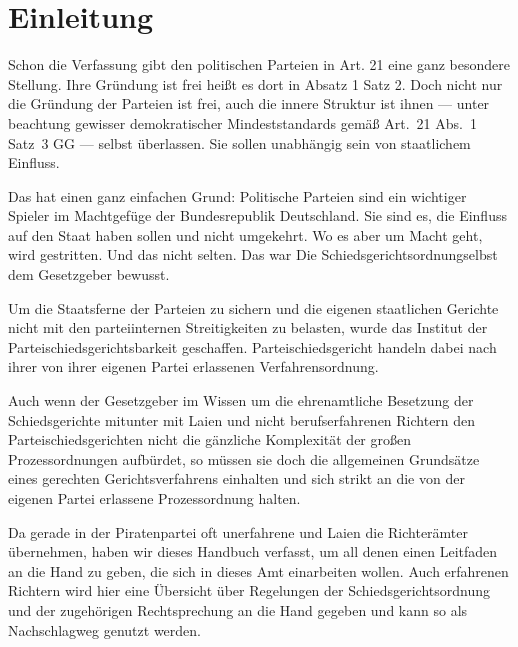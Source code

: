 
\chapter{Einleitung}
Schon die Verfassung gibt den politischen Parteien in Art. 21 eine ganz besondere Stellung.
Ihre Gründung ist frei heißt es dort in Absatz 1 Satz 2.
Doch nicht nur die Gründung der Parteien ist frei, auch die innere Struktur ist ihnen --- unter beachtung gewisser demokratischer Mindeststandards gemäß Art.~21 Abs.~1 Satz~3 GG --- selbst überlassen.
Sie sollen unabhängig sein von staatlichem Einfluss.

Das hat einen ganz einfachen Grund: Politische Parteien sind ein wichtiger Spieler im Machtgefüge der Bundesrepublik Deutschland.
Sie sind es, die Einfluss auf den Staat haben sollen und nicht umgekehrt.
Wo es aber um Macht geht, wird gestritten.
Und das nicht selten.
Das war Die Schiedsgerichtsordnungselbst dem Gesetzgeber bewusst.

Um die Staatsferne der Parteien zu sichern und die eigenen staatlichen Gerichte nicht mit den parteiinternen Streitigkeiten zu belasten, wurde das Institut der Parteischiedsgerichtsbarkeit geschaffen.
Parteischiedsgericht handeln dabei nach ihrer von ihrer eigenen Partei erlassenen Verfahrensordnung.

Auch wenn der Gesetzgeber im Wissen um die ehrenamtliche Besetzung der Schiedsgerichte mitunter mit Laien und nicht berufserfahrenen Richtern den Parteischiedsgerichten nicht die gänzliche Komplexität der großen Prozessordnungen aufbürdet, so müssen sie doch die allgemeinen Grundsätze eines gerechten Gerichtsverfahrens einhalten und sich strikt an  die von der eigenen Partei erlassene Prozessordnung halten.

Da gerade in der Piratenpartei oft unerfahrene und Laien die Richterämter übernehmen, haben wir dieses Handbuch verfasst, um all denen einen Leitfaden an die Hand zu geben, die sich in dieses Amt einarbeiten wollen.
Auch erfahrenen Richtern wird hier eine Übersicht über Regelungen der Schiedsgerichtsordnung und der zugehörigen Rechtsprechung an die Hand gegeben und kann so als Nachschlagweg genutzt werden.

